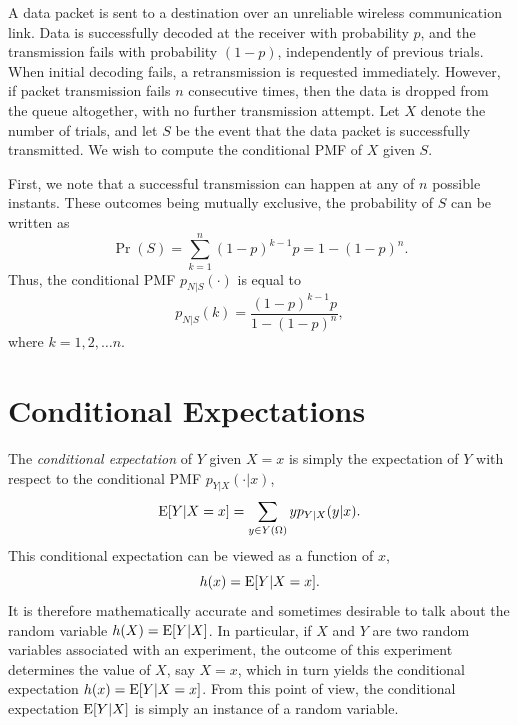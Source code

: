 \begin{example}
A data packet is sent to a destination over an unreliable wireless communication link.
Data is successfully decoded at the receiver with probability $p$, and the transmission fails with probability $(1-p)$, independently of previous trials.
When initial decoding fails, a retransmission is requested immediately.
However, if packet transmission fails $n$ consecutive times, then the data is dropped from the queue altogether, with no further transmission attempt.
Let $X$ denote the number of trials, and let $S$ be the event that the data packet is successfully transmitted.
We wish to compute the conditional PMF of $X$ given $S$.

First, we note that a successful transmission can happen at any of $n$ possible instants.
These outcomes being mutually exclusive, the probability of $S$ can be written as
\begin{equation*}
\Pr(S) = \sum_{k=1}^n (1-p)^{k-1} p = 1 - (1-p)^n .
\end{equation*}
Thus, the conditional PMF $p_{N|S} (\cdot)$ is equal to
\begin{equation*}
p_{N|S} (k) = \frac{ (1-p)^{k-1} p }{1 - (1-p)^n} ,
\end{equation*}
where $k = 1, 2, \ldots n$.
\end{example}


\section{Conditional Expectations}

The \emph{conditional expectation} of $Y$ given $X = x$ is simply the expectation of $Y$ with respect to the conditional PMF $p_{Y|X} (\cdot | x)$, 
\begin{equation*}
\mathrm{E} [Y | X = x ] = \sum_{y \in Y(\Omega)} y p_{Y|X} (y|x).
\end{equation*}
This conditional expectation can be viewed as a function of $x$,
\begin{equation*}
h(x) = \mathrm{E} [Y | X = x] .
\end{equation*}
It is therefore mathematically accurate and sometimes desirable to talk about the random variable $h (X) = \mathrm{E} [Y | X]$.
In particular, if $X$ and $Y$ are two random variables associated with an experiment, the outcome of this experiment determines the value of $X$, say $X = x$, which in turn yields the conditional expectation $h(x) = \mathrm{E} [Y | X = x]$.
From this point of view, the conditional expectation $\mathrm{E} [Y | X]$ is simply an instance of a random variable.

